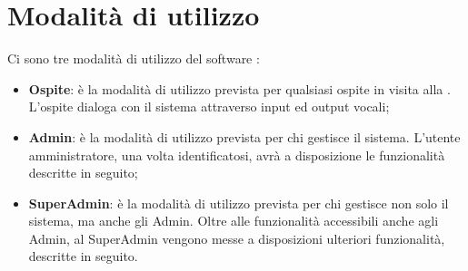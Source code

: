 \documentclass[../ManualeSviluppatore_v1.0.0.tex]{subfiles}
\begin{document}
\section{Modalità di utilizzo}

	Ci sono tre modalità di utilizzo del software \atavi:
	\begin{itemize}
		\item{\textbf{Ospite}: è la modalità di utilizzo prevista per qualsiasi ospite in visita alla \prop. L'ospite dialoga con il sistema attraverso input ed output vocali;}
		\item{\textbf{\gls{Admin}}: è la modalità di utilizzo prevista per chi gestisce il sistema. L'utente amministratore, una volta identificatosi, avrà a disposizione le funzionalità descritte in seguito;}
		\item{\textbf{\gls{SuperAdmin}}: è la modalità di utilizzo prevista per chi gestisce non solo il sistema, ma anche gli Admin. Oltre alle funzionalità accessibili anche agli Admin, al SuperAdmin vengono messe a disposizioni ulteriori funzionalità, descritte in seguito.}
	\end{itemize}
	
\end{document}
